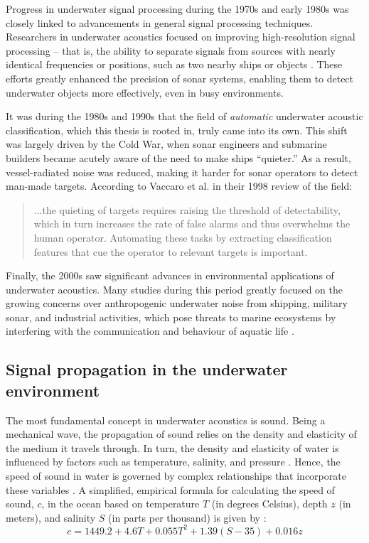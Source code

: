 Progress in underwater signal processing during the 1970s and early 1980s was closely linked to advancements in general signal processing techniques. Researchers in underwater acoustics focused on improving high-resolution signal processing -- that is, the ability to separate signals from sources with nearly identical frequencies or positions, such as two nearby ships or objects \cite{vaccaro_past_1998}. These efforts greatly enhanced the precision of sonar systems, enabling them to detect underwater objects more effectively, even in busy environments.

It was during the 1980s and 1990s that the field of \textit{automatic} underwater acoustic classification, which this thesis is rooted in, truly came into its own. This shift was largely driven by the Cold War, when sonar engineers and submarine builders became acutely aware of the need to make ships ``quieter.'' As a result, vessel-radiated noise was reduced, making it harder for sonar operators to detect man-made targets. According to Vaccaro et al. in their 1998 review of the field:

\begin{quote}
    ...the quieting of targets requires raising the threshold of detectability, which in turn increases the rate of false alarms and thus overwhelms the human operator. Automating these tasks by extracting classification features that cue the operator to relevant targets is important. \cite[46]{vaccaro_past_1998}
\end{quote}

Finally, the 2000s saw significant advances in environmental applications of underwater acoustics. Many studies during this period greatly focused on the growing concerns over anthropogenic underwater noise from shipping, military sonar, and industrial activities, which pose threats to marine ecosystems by interfering with the communication and behaviour of aquatic life \cite{erbe_underwater_2002, slabbekoorn_noisy_2010, wysocki_diversity_2007}.

\subsection{Signal propagation in the underwater environment}\label{subsec:sig-prop-uw-env}

The most fundamental concept in underwater acoustics is sound. Being a mechanical wave, the propagation of sound relies on the density and elasticity of the medium it travels through. In turn, the density and elasticity of water is influenced by factors such as temperature, salinity, and pressure \cite{sinay_diving_2024}. Hence, the speed of sound in water is governed by complex relationships that incorporate these variables \cite{leroy_new_2008}. A simplified, empirical formula for calculating the speed of sound, $c$, in the ocean based on temperature $T$ (in degrees Celsius), depth $z$ (in meters), and salinity $S$ (in parts per thousand) is given by \cite{abraham_underwater_2019}: 
\begin{equation}
c = 1449.2 + 4.6T + 0.055T^2 + 1.39(S - 35) + 0.016z \label{eq:speed-of-sound-in-water}
\end{equation}

